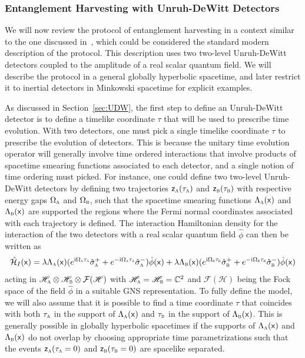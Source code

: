 \documentclass[letterpaper,12pt,titlepage,oneside,final]{book}
\newcommand{\mf}{\mathsf}%
\newcommand{\ii}{\mathrm{i}}
\newcommand{\tc}[1]{\textsc{#1}}
\begin{document}
\subsubsection*{Entanglement Harvesting with Unruh-DeWitt Detectors}

We will now review the protocol of entanglement harvesting in a context similar to the one discussed in~\cite{Pozas-Kerstjens:2015}, which could be considered the standard modern description of the protocol. This description uses two two-level Unruh-DeWitt detectors coupled to the amplitude of a real scalar quantum field. We will describe the protocol in a general globally hyperbolic spacetime, and later restrict it to inertial detectors in Minkowski spacetime for explicit examples. 

As discussed in Section~\ref{sec:UDW}, the first step to define an Unruh-DeWitt detector is to define a timelike coordinate $\tau$ that will be used to prescribe time evolution. With two detectors, one must pick a single timelike coordinate $\tau$ to prescribe the evolution of  detectors. This is because the unitary time evolution operator will generally involve time ordered interactions that involve products of spacetime smearing functions associated to each detector, and a single notion of time ordering must picked. For instance, one could define two two-level Unruh-DeWitt detectors by defining two trajectories $\mf z_\tc{a}(\tau_\tc{a})$ and $\mf z_\tc{b}(\tau_\tc{b})$ with respective energy gaps $\Omega_\tc{a}$ and $\Omega_\tc{b}$, such that the spacetime smearing functions $\Lambda_\tc{a}(\mf x)$ and $\Lambda_\tc{b}(\mf x)$ are supported the regions where the Fermi normal coordinates associated with each trajectory is defined. The interaction Hamiltonian density for the interaction of the two detectors with a real scalar quantum field $\hat{\phi}$ can then be written as
\begin{equation}\label{eq:HItwoUDWs}
    \hat{\mathcal{H}}_I(\mf x) = \lambda \Lambda_\tc{a}(\mf x) (e^{\ii \Omega_\tc{a} \tau_\tc{a}}\hat{\sigma}_\tc{a}^+ + e^{-\ii \Omega_\tc{a} \tau_\tc{a}}\hat{\sigma}_\tc{a}^-)\hat{\phi}(\mf x)+\lambda \Lambda_\tc{b}(\mf x) (e^{\ii \Omega_\tc{b} \tau_\tc{b}}\hat{\sigma}_\tc{b}^+ + e^{-\ii \Omega_\tc{b} \tau_\tc{b}}\hat{\sigma}_\tc{b}^-)\hat{\phi}(\mf x)
\end{equation}
acting in $\mathscr{H}_\tc{a}\otimes\mathscr{H}_\tc{b}\otimes \mathcal{F}(\mathscr{H})$ with $\mathscr{H}_\tc{a} = \mathscr{H}_\tc{b} = \mathbb{C}^2$ and $\mathcal{F}(\mathscr{H})$ being the Fock space of the field $\hat{\phi}$ in a suitable GNS representation. To fully define the model, we will also assume that it is possible to find a time coordinate $\tau$ that coincides with both $\tau_\tc{a}$ in the support of $\Lambda_\tc{a}(\mf x)$ and $\tau_\tc{b}$ in the support of $\Lambda_\tc{b}(\mf x)$. This is generally possible in globally hyperbolic spacetimes if the supports of $\Lambda_\tc{a}(\mf x)$ and $\Lambda_\tc{b}(\mf x)$ do not overlap by choosing appropriate time parametrizations such that the events $\mf z_\tc{a}(\tau_\tc{a} = 0)$ and $\mf z_\tc{b}(\tau_\tc{b} = 0)$ are spacelike separated.
\end{document}

